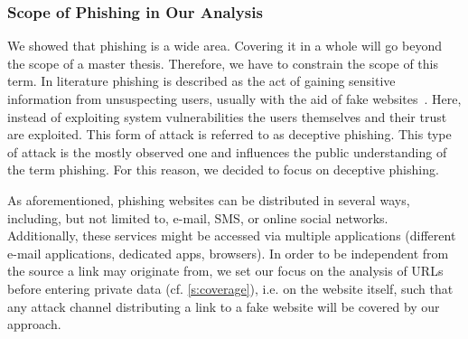 \subsubsection{Scope of Phishing in Our Analysis}
\label{s:scope}
We showed that phishing is a wide area. 
Covering it in a whole will go beyond the scope of a master thesis. 
Therefore, we have to constrain the scope of this term.
 In literature phishing is described as the act of gaining sensitive information from unsuspecting users, usually with the aid of fake websites~\cite{sheng2007antiphishingphil, antiphishingtrendreport2013, kasperskyreport2013}.
Here, instead of exploiting system vulnerabilities the users themselves and their trust are exploited.
This form of attack is referred to as deceptive phishing.
This type of attack is the mostly observed one and influences the public understanding of the term phishing.
 For this reason, we decided to focus on deceptive phishing.
 
 As aforementioned, phishing websites can be distributed in several ways, including, but not limited to, e-mail, SMS, or online social networks.
 Additionally, these services might be accessed via multiple applications (different e-mail applications, dedicated apps, browsers).
 In order to be independent from the source a link may originate from, we set our focus on the analysis of URLs before entering private data (cf. \autoref{s:coverage}), i.e. on the website itself, such that any attack channel distributing a link to a fake website will be covered by our approach.
 
